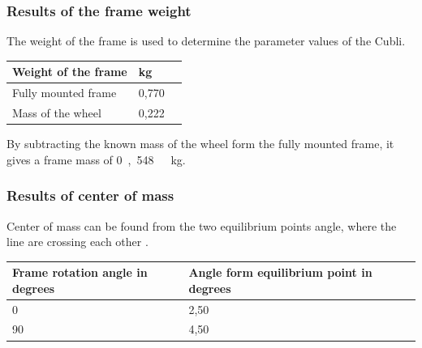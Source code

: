 \subsubsection{Results of the frame weight}
The weight of the frame is used to determine the parameter values of the Cubli.
\begin{table}[H]
	\begin{tabular}{|l|l|p{4.3cm}|}
		\hline%
		\textbf{Weight of the frame}       &  \textbf{kg}         \\
		\hline%
		Fully mounted frame        	  & 0,770          \\
		\hline%
		Mass of the wheel        	  & 0,222          \\
		\hline%
	\end{tabular}
\end{table}	
By subtracting the known mass of the wheel form the fully mounted frame, it gives a frame mass of \si{0,548\ kg}.

\subsubsection{Results of center of mass}
Center of mass can be found from the two equilibrium points angle, where the line are crossing each other .
\begin{table}[H]
	\begin{tabular}{|l|l|p{4.3cm}|}
		\hline%
		\textbf{Frame rotation angle in degrees}       &  \textbf{Angle form equilibrium point in degrees}         \\
		\hline%
		0                                & 2,50           \\
		\hline%
		90							  & 4,50              \\
		\hline%
	\end{tabular}
\end{table}


